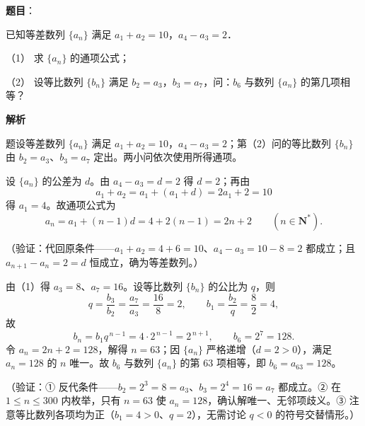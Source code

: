 \begin{answer}

\textbf{题目}：

已知等差数列 \(\{a_{n}\}\) 满足 \(a_{1}+a_{2}=10\)，\(a_{4}-a_{3}=2\)．

（1） 求 \(\{a_{n}\}\) 的通项公式；

（2） 设等比数列 \(\{b_{n}\}\) 满足 \(b_{2}=a_{3}\)，\(b_{3}=a_{7}\)，问：\(b_{6}\) 与数列 \(\{a_{n}\}\) 的第几项相等？

\textbf{解析}

题设等差数列 \(\{a_{n}\}\) 满足 \(a_{1}+a_{2}=10\)，\(a_{4}-a_{3}=2\)；第（2）问的等比数列 \(\{b_{n}\}\) 由 \(b_{2}=a_{3}\)、\(b_{3}=a_{7}\) 定出。两小问依次使用所得通项。


设 \(\{a_{n}\}\) 的公差为 \(d\)。由 \(a_{4}-a_{3}=d=2\) 得 \(d=2\)；再由
\nopagebreak[4]
\[
a_{1}+a_{2}=a_{1}+(a_{1}+d)=2a_{1}+2=10
\]
得 \(a_{1}=4\)。故通项公式为
\nopagebreak[4]
\[
a_{n}=a_{1}+(n-1)d=4+2(n-1)=2n+2\qquad(n\in\mathbf{N}^{*}).
\]

（验证：代回原条件——\(a_{1}+a_{2}=4+6=10\)、\(a_{4}-a_{3}=10-8=2\) 都成立；且 \(a_{n+1}-a_{n}=2=d\) 恒成立，确为等差数列。）


由（1）得 \(a_{3}=8\)、\(a_{7}=16\)。设等比数列 \(\{b_{n}\}\) 的公比为 \(q\)，则
\nopagebreak[4]
\[
q=\frac{b_{3}}{b_{2}}=\frac{a_{7}}{a_{3}}=\frac{16}{8}=2,\qquad b_{1}=\frac{b_{2}}{q}=\frac{8}{2}=4,
\]
故
\nopagebreak[4]
\[
b_{n}=b_{1}q^{\,n-1}=4\cdot2^{\,n-1}=2^{\,n+1},\qquad b_{6}=2^{7}=128 .
\]
令 \(a_{n}=2n+2=128\)，解得 \(n=63\)；因 \(\{a_{n}\}\) 严格递增（\(d=2>0\)），满足 \(a_{n}=128\) 的 \(n\) 唯一。故 \(b_{6}\) 与数列 \(\{a_{n}\}\) 的第 \(63\) 项相等，即 \(b_{6}=a_{63}=128\)。

（验证：① 反代条件——\(b_{2}=2^{3}=8=a_{3}\)、\(b_{3}=2^{4}=16=a_{7}\) 都成立。② 在 \(1\leqslant n\leqslant300\) 内枚举，只有 \(n=63\) 使 \(a_{n}=128\)，确认解唯一、无邻项歧义。③ 注意等比数列各项均为正（\(b_{1}=4>0\)、\(q=2\)），无需讨论 \(q<0\) 的符号交替情形。）



\end{answer}
